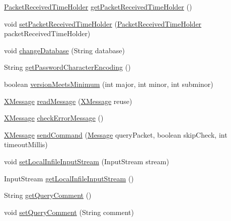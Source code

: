 \begin{DoxyCompactItemize}
\item 
\mbox{\hyperlink{interfacecom_1_1mysql_1_1cj_1_1protocol_1_1_packet_received_time_holder}{Packet\+Received\+Time\+Holder}} \mbox{\hyperlink{classcom_1_1mysql_1_1cj_1_1protocol_1_1x_1_1_x_protocol_a67b0b956239ad6b2a4d455c2b62d0050}{get\+Packet\+Received\+Time\+Holder}} ()
\item 
void \mbox{\hyperlink{classcom_1_1mysql_1_1cj_1_1protocol_1_1x_1_1_x_protocol_a685b806cae4f1af5e33f7a73fd43d285}{set\+Packet\+Received\+Time\+Holder}} (\mbox{\hyperlink{interfacecom_1_1mysql_1_1cj_1_1protocol_1_1_packet_received_time_holder}{Packet\+Received\+Time\+Holder}} packet\+Received\+Time\+Holder)
\item 
void \mbox{\hyperlink{classcom_1_1mysql_1_1cj_1_1protocol_1_1x_1_1_x_protocol_a0370d4b1edd7b63667381cb3bd6b3085}{change\+Database}} (String database)
\item 
String \mbox{\hyperlink{classcom_1_1mysql_1_1cj_1_1protocol_1_1x_1_1_x_protocol_afb296fd1ce274c0cb1fc920ce64220fe}{get\+Password\+Character\+Encoding}} ()
\item 
boolean \mbox{\hyperlink{classcom_1_1mysql_1_1cj_1_1protocol_1_1x_1_1_x_protocol_a8895e989b506fa14b82358935c6b34f2}{version\+Meets\+Minimum}} (int major, int minor, int subminor)
\item 
\mbox{\hyperlink{classcom_1_1mysql_1_1cj_1_1protocol_1_1x_1_1_x_message}{X\+Message}} \mbox{\hyperlink{classcom_1_1mysql_1_1cj_1_1protocol_1_1x_1_1_x_protocol_a44f83c9465a2b0d32c040e7e32290506}{read\+Message}} (\mbox{\hyperlink{classcom_1_1mysql_1_1cj_1_1protocol_1_1x_1_1_x_message}{X\+Message}} reuse)
\item 
\mbox{\hyperlink{classcom_1_1mysql_1_1cj_1_1protocol_1_1x_1_1_x_message}{X\+Message}} \mbox{\hyperlink{classcom_1_1mysql_1_1cj_1_1protocol_1_1x_1_1_x_protocol_a3774ce524cf53d4c5412c0b4d5a3dbda}{check\+Error\+Message}} ()
\item 
\mbox{\hyperlink{classcom_1_1mysql_1_1cj_1_1protocol_1_1x_1_1_x_message}{X\+Message}} \mbox{\hyperlink{classcom_1_1mysql_1_1cj_1_1protocol_1_1x_1_1_x_protocol_a0ecabba038f9c769909e05a53d6c9657}{send\+Command}} (\mbox{\hyperlink{interfacecom_1_1mysql_1_1cj_1_1protocol_1_1_message}{Message}} query\+Packet, boolean skip\+Check, int timeout\+Millis)
\item 
void \mbox{\hyperlink{classcom_1_1mysql_1_1cj_1_1protocol_1_1x_1_1_x_protocol_a4f539adc72747ef03c94bc92acde5efb}{set\+Local\+Infile\+Input\+Stream}} (Input\+Stream stream)
\item 
Input\+Stream \mbox{\hyperlink{classcom_1_1mysql_1_1cj_1_1protocol_1_1x_1_1_x_protocol_a5a291c17d84fa71984b3a65ecbb91315}{get\+Local\+Infile\+Input\+Stream}} ()
\item 
String \mbox{\hyperlink{classcom_1_1mysql_1_1cj_1_1protocol_1_1x_1_1_x_protocol_aa6abdec32fdb1e18c44c33b831b40e20}{get\+Query\+Comment}} ()
\item 
void \mbox{\hyperlink{classcom_1_1mysql_1_1cj_1_1protocol_1_1x_1_1_x_protocol_ab009a2b06f09d53869c8983bed6c96b8}{set\+Query\+Comment}} (String comment)
\end{DoxyCompactItemize}
